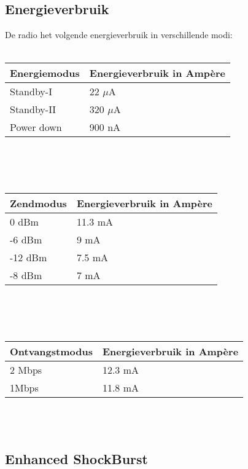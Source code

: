 \documentclass{article}
\begin{document}
\subsection{Energieverbruik}	
De radio het volgende energieverbruik in verschillende modi:\\
\\	
\begin{tabular}{|l|l|}
\hline
\textbf{Energiemodus}  & \textbf{Energieverbruik in Amp\`ere}     \\
\hline
Standby-I   & 22 $\mu$A    	\\
Standby-II  & 320 $\mu$A	\\
Power down  & 900 nA \\ \hline
\end{tabular}\\
\\
\\
\begin{tabular}{|l|l|}
\hline
\textbf{Zendmodus}  & \textbf{Energieverbruik in Amp\`ere}     \\
\hline
0 dBm  	& 11.3 mA	\\
-6 dBm 	& 9 mA    	\\
-12 dBm & 7.5 mA  	\\
-8 dBm 	& 7 mA		\\ \hline
\end{tabular}\\
\\
\\
\begin{tabular}{|l|l|}
\hline
\textbf{Ontvangstmodus}  & \textbf{Energieverbruik in Amp\`ere}     \\
\hline
2 Mbps  & 12.3 mA    \\
1Mbps	& 11.8 mA    \\ \hline 
\end{tabular}\\
\\

\subsection{Enhanced ShockBurst}
\end{document}
